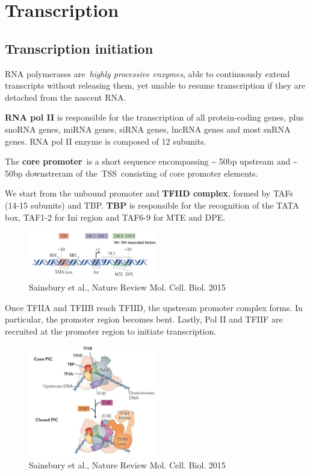 \graphicspath{{chapters/_resources/}}

\chapter{Transcription}

\hypertarget{transcription-initiation}{%
\section{Transcription initiation}\label{transcription-initiation}}

RNA polymerases are~\emph{highly processive enzymes}, able to continuously extend transcripts without releasing them, yet unable to resume transcription if they are detached from the nascent RNA.

\textbf{RNA pol II} is responsible for the transcription of all protein-coding genes, plus snoRNA genes, miRNA genes, siRNA genes, lncRNA genes and most snRNA genes. RNA pol II enzyme is composed of 12 subunits.

The \textbf{core promoter}~is a short sequence encompassing \textasciitilde{} 50bp upstream and \textasciitilde{} 50bp downstreram of the~TSS~consisting of core promoter elements.

We start from the unbound promoter and \textbf{TFIID complex}, formed by TAFs (14-15 subunits) and TBP. \textbf{TBP} is responsible for the recognition of the TATA box, TAF1-2 for Ini region and TAF6-9 for MTE and DPE.

\begin{figure}
\centering
\includegraphics[width=0.5\textwidth]{../_resources/Screenshot_2022-09-16_at_12-11-22.png}
\caption{Sainsbury et al., Nature Review Mol. Cell. Biol. 2015}
\end{figure}

Once TFIIA and TFIIB reach TFIID, the upstream promoter complex forms. In particular, the promoter region becomes bent. Lastly, Pol II and TFIIF are recruited at the promoter region to initiate transcription.

\begin{figure}
\centering
\includegraphics[width=0.5\textwidth]{../_resources/Screenshot_2022-09-16_at_15-53-19.png}
\caption{Sainsbury et al., Nature Review Mol. Cell. Biol. 2015}
\end{figure}

